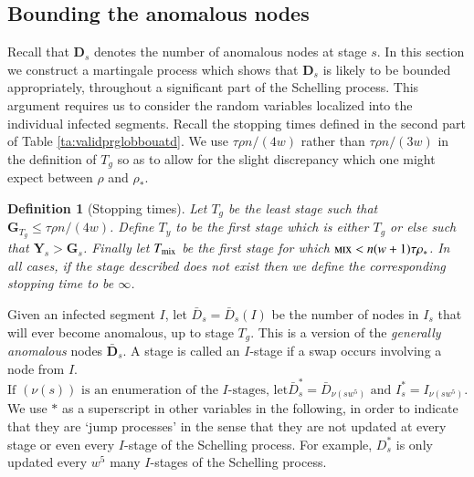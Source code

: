 \documentclass[11pt]{article}
\theoremstyle{plain}
\newtheorem{defi}[thm]{Definition}
\numberwithin{equation}{subsection}
\newcommand{\DD}{\mathbf{D}}
\newcommand{\GG}{\mathbf{G}}
\newcommand{\YY}{\mathbf{Y}}
\newcommand{\mix}{\textsc{mix}}
\begin{document}
\subsection{Bounding the anomalous nodes}
Recall that $\DD_s$ denotes the number of anomalous nodes at stage $s$. In this section we
construct a martingale process which shows that $\DD_s$ is likely to be bounded appropriately,
throughout a significant part of the Schelling process. This argument requires us to consider
the random variables localized into the individual infected segments.
Recall the stopping times defined in
the second part of Table \ref{ta:validprglobbouatd}. 
We use $ \tau\rho n/(4w)$ rather than $ \tau\rho n/(3w)$ in the definition of $T_g$ 
so as to allow for the slight discrepancy which one might expect between $\rho$ and $\rho_{\ast}$.  

\begin{defi}[Stopping times]
Let  $T_g$ be the least stage such that
$\GG_{T_g}\leq \tau\rho n/(4w)$.
Define $T_y$ to be the first stage which is either  $ T_g$
or else such that $\YY_s>\GG_s$. 
Finally let $T_{\textup{mix}}$ be the first stage for which
$\mix <n(w+1)\tau\rho_{\ast}$. In all cases, if the stage 
described does not exist then we define the corresponding stopping time to be $\infty$. 
\end{defi}


Given an infected segment $I$, let   
$\bar{D}_s=\bar{D}_s(I)$ be the number of 
nodes in $I_s$ that will ever become anomalous, up to stage $T_g$.
This is a version of the {\em generally anomalous} nodes $\bar{\DD}_s$.
A stage is called an $I$-stage if a swap occurs involving a node from $I$.
\[
\textrm{If $(\nu(s))$ is an enumeration of the $I$-stages, let
$\bar{D}_{s}^{\ast}=\bar{D}_{\nu(sw^5)}$ and $I^{\ast}_s=I_{\nu(sw^5)}$.}
\]
We use $\ast$ as a superscript in other variables in the following, in order to indicate that they
are `jump processes' in the sense that they are not updated at every stage or even every $I$-stage 
of the Schelling process. For example, $D_{s}^{\ast}$ is only updated every $w^5$ many $I$-stages of the
Schelling process.
\end{document}
